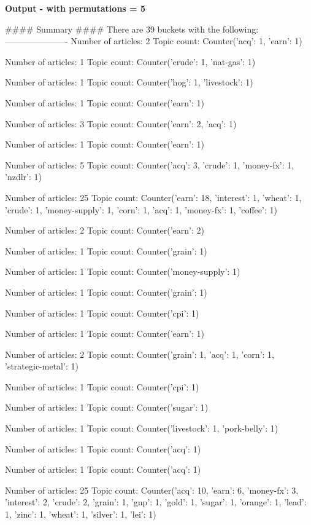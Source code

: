 \documentclass{article}
\begin{document}
\textbf{Output - with permutations = 5}\\
\begin{pythonOutput}
#### Summary ####
There are 39 buckets with the following:
----------------------
Number of articles: 2
Topic count: Counter({'acq': 1, 'earn': 1})

Number of articles: 1
Topic count: Counter({'crude': 1, 'nat-gas': 1})

Number of articles: 1
Topic count: Counter({'hog': 1, 'livestock': 1})

Number of articles: 1
Topic count: Counter({'earn': 1})

Number of articles: 3
Topic count: Counter({'earn': 2, 'acq': 1})

Number of articles: 1
Topic count: Counter({'earn': 1})

Number of articles: 5
Topic count: Counter({'acq': 3, 'crude': 1, 'money-fx': 1, 'nzdlr': 1})

Number of articles: 25
Topic count: Counter({'earn': 18, 'interest': 1, 'wheat': 1, 'crude': 1, 'money-supply': 1, 'corn': 1, 'acq': 1, 'money-fx': 1, 'coffee': 1})

Number of articles: 2
Topic count: Counter({'earn': 2})

Number of articles: 1
Topic count: Counter({'grain': 1})

Number of articles: 1
Topic count: Counter({'money-supply': 1})

Number of articles: 1
Topic count: Counter({'grain': 1})

Number of articles: 1
Topic count: Counter({'cpi': 1})

Number of articles: 1
Topic count: Counter({'earn': 1})

Number of articles: 2
Topic count: Counter({'grain': 1, 'acq': 1, 'corn': 1, 'strategic-metal': 1})

Number of articles: 1
Topic count: Counter({'cpi': 1})

Number of articles: 1
Topic count: Counter({'sugar': 1})

Number of articles: 1
Topic count: Counter({'livestock': 1, 'pork-belly': 1})

Number of articles: 1
Topic count: Counter({'acq': 1})

Number of articles: 1
Topic count: Counter({'acq': 1})

Number of articles: 25
Topic count: Counter({'acq': 10, 'earn': 6, 'money-fx': 3, 'interest': 2, 'crude': 2, 'grain': 1, 'gnp': 1, 'gold': 1, 'sugar': 1, 'orange': 1, 'lead': 1, 'zinc': 1, 'wheat': 1, 'silver': 1, 'lei': 1})


\end{pythonOutput}
\end{document}
